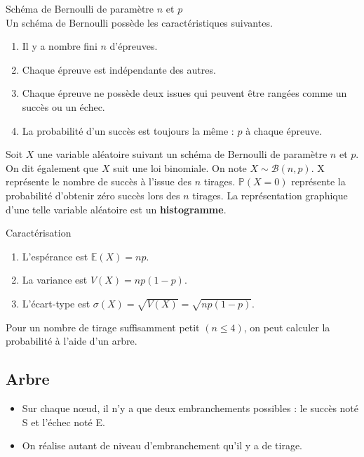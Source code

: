 \documentclass[paper=a4, fontsize=9pt]{scrartcl} %
\begin{document}
\begin{Definition}{Schéma de Bernoulli de paramètre $n$ et $p$}\\
  Un schéma de Bernoulli possède les caractéristiques suivantes.
  \begin{enumerate}
  \item Il y a nombre fini $n$ d'épreuves.
  \item Chaque épreuve est indépendante des autres.
  \item Chaque épreuve ne possède deux issues qui peuvent être rangées comme un succès ou un échec.
  \item La probabilité d'un succès est toujours la même : $p$ à chaque épreuve.
  \end{enumerate}
\end{Definition}

Soit $X$ une variable aléatoire suivant un schéma de Bernoulli de paramètre $n$ et $p$. On dit également que $X$ suit une loi binomiale. On note $X \sim \mathcal{B}(n,p)$. X représente le nombre de succès à l'issue des $n$ tirages. $\mathbb{P}(X = 0)$ représente la probabilité d'obtenir zéro succès lors des $n$ tirages. La représentation graphique d'une telle variable aléatoire est un \textbf{histogramme}.\\


\begin{Proposition}{Caractérisation}
  \begin{enumerate}
  \item L'espérance est $\mathbb{E}(X) = np$.
  \item La variance est $V(X)  = n p (1-p)$.
  \item L'écart-type est $\sigma(X) = \sqrt{V(X)} = \sqrt{np(1-p)}$.
  \end{enumerate}
\end{Proposition}

Pour un nombre de tirage suffisamment petit $(n \leq 4)$, on peut calculer la probabilité à l'aide d'un arbre.

\subsection{Arbre}

\begin{itemize}
\item Sur chaque nœud, il n'y a que deux embranchements possibles : le succès noté S et l'échec noté E. 
\item On réalise autant de niveau d'embranchement qu'il y a de tirage.
\end{itemize}
\end{document}

